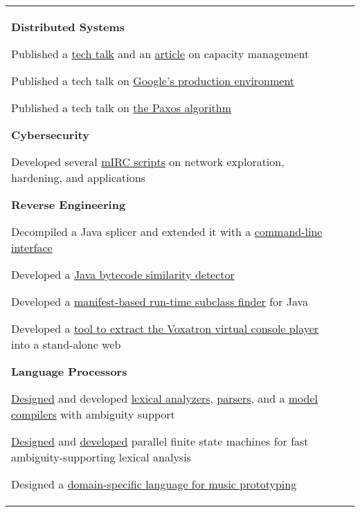 \documentclass[letterpaper,10pt,oneside]{article}
\newcommand{\itemspacingtwo}{\vspace{0.08cm}}
\newenvironment{body}
{\par\par
\begin{longtable}{p{0.145\textwidth}p{0.81\textwidth}}}
{\par\end{longtable}\par}
\begin{document}
\begin{body}
\textbf{Distributed Systems}
\begin{comp}
\item Published a \href{https://youtu.be/pOo0oKNM9I8}{tech talk} and an \href{https://static.googleusercontent.com/media/sre.google/en//static/pdf/login_winter20_10_torres.pdf}{article} on capacity management
\item Published a tech talk on \href{https://youtu.be/dhTVVWzpc4Q}{Google's production environment}
\item Published a tech talk on \href{https://youtu.be/d7nAGI_NZPk}{the Paxos algorithm}
\end{comp}
\itemspacingtwo

\textbf{Cybersecurity}
\begin{comp}
\item Developed several \href{https://github.com/lquesada/My-mIRC-Scripts}{mIRC scripts} on network exploration, hardening, and applications
\end{comp}
\itemspacingtwo

\textbf{Reverse Engineering}
\begin{comp}
\item Decompiled a Java splicer and extended it with a \href{https://github.com/lquesada/JarSplicePlus}{command-line interface}
\item Developed a \href{https://github.com/lquesada/JSimil}{Java bytecode similarity detector}
\item Developed a \href{https://github.com/lquesada/RunTimeSubclassFinder}{manifest-based run-time subclass finder} for Java
\item Developed a \href{https://github.com/lquesada/voxatron-in-a-web}{tool to extract the Voxatron virtual console player} into a stand-alone web
\end{comp}
\itemspacingtwo

\textbf{Language Processors}
\begin{comp}
\item \href{https://www.worldscientific.com/doi/abs/10.1142/S0218194014500375}{Designed} and developed \href{https://github.com/lquesada/ModelCC/tree/master/ModelCC/src/org/modelcc/lexer}{lexical analyzers}, \href{https://github.com/lquesada/ModelCC/tree/master/ModelCC/src/org/modelcc/parser}{parsers}, and a \href{https://github.com/lquesada/ModelCC}{model compilers} with ambiguity support
\item \href{https://www.scitepress.org/Link.aspx?doi=10.5220/0003949901050110}{Designed} and \href{https://github.com/lquesada/PFSMs-Java}{developed} parallel finite state machines for fast ambiguity-supporting lexical analysis 
\item Designed a \href{https://github.com/lquesada/ADAgio}{domain-specific language for music prototyping}
\end{comp}
\itemspacingtwo


\end{body}
\end{document}
